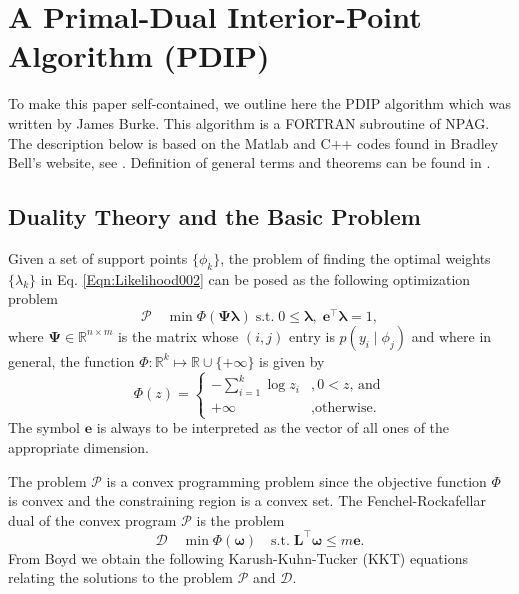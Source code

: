 %
%
\newpage
\appendix
\section{A Primal-Dual Interior-Point Algorithm (PDIP) }
\label{App:PDIP}

To make this paper self-contained, we outline here the PDIP algorithm which was written by James Burke.
This algorithm is a FORTRAN subroutine of NPAG. The description below is based on the Matlab and C++  codes  found in Bradley Bell's website, 
see \cite{Bell2012b:Online}.
 Definition of general terms and theorems can be found in  \citet{Boyd2004}.

\subsection{Duality Theory and the Basic Problem}
Given a set of support points $\{\phi_k\}$, the problem of finding the optimal weights $\{\lambda_k\}$ in Eq. \ref{Eqn:Likelihood002} can be posed as the following optimization problem
%
\[
	\mathcal{P} \quad \min \Phi\left( \bm{\Psi\lambda} \right) \; \mbox{s.t.} \; 0 \le \bm{\lambda}, \; \bm{e}^\intercal\bm{\lambda} = 1,
\]
where $\bm{\Psi} \in \mathbb{R}^{n \times m}$ is the matrix whose $(i,j)$ entry is $p(y_i \mid \phi_j)$ and where in general, the function $\Phi : {\mathbb R}^k \mapsto {\mathbb R} \cup \{ +\infty \}$ is given by
%
\begin{equation}
	\Phi(z) = \begin{cases}
			- \sum_{i=1}^{k} \log z_i &,\mbox{$0 < z$, and} \\
			+\infty &, \mbox{otherwise.}
		\end{cases}
\end{equation}
The symbol $\bm{e}$ is always to be interpreted as the vector of all ones of the appropriate dimension. 

The problem ${\mathcal P}$ is a convex programming problem since the objective function $\Phi$ is convex and the constraining region is a convex set.    The Fenchel-Rockafellar dual of the convex program ${\mathcal P}$ is the problem
\[
	{\mathcal D} \quad \min_{} \Phi(\bm{\omega}) \quad \mbox{s.t.} \; \bm{L}^\intercal \bm{\omega} \le m\bm{e}.
\]
From Boyd we obtain the following Karush-Kuhn-Tucker (KKT) equations relating the solutions to the problem ${\mathcal P}$ and ${\mathcal D}$.


